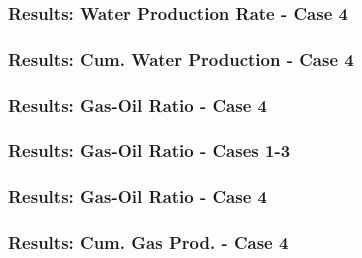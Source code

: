 
\begin{frame}
    \frametitle{Results: Water Production Rate - Case 4}
    \centerline{}
\end{frame}

\begin{frame}
    \frametitle{Results: Cum. Water Production - Case 4}
    \centerline{}
\end{frame}


\begin{frame}
    \frametitle{Results: Gas-Oil Ratio - Case 4}
    \centerline{}
\end{frame}

\begin{frame}
    \frametitle{Results: Gas-Oil Ratio - Cases 1-3}
    \centerline{}
\end{frame}

\begin{frame}
    \frametitle{Results: Gas-Oil Ratio - Case 4}
    \centerline{}
\end{frame}

\begin{frame}
    \frametitle{Results: Cum. Gas Prod. - Case 4}
    \centerline{}
\end{frame}


